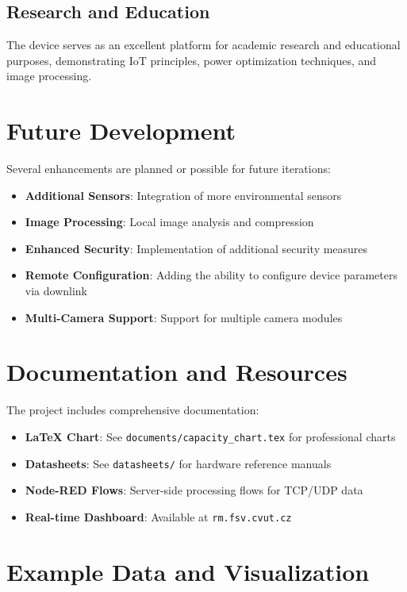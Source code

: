 \documentclass[11pt,a4paper]{article}
\begin{document}
\subsection{Research and Education}

The device serves as an excellent platform for academic research and educational purposes, demonstrating IoT principles, power optimization techniques, and image processing.

\section{Future Development}

Several enhancements are planned or possible for future iterations:

\begin{itemize}
    \item \textbf{Additional Sensors}: Integration of more environmental sensors
    \item \textbf{Image Processing}: Local image analysis and compression
    \item \textbf{Enhanced Security}: Implementation of additional security measures
    \item \textbf{Remote Configuration}: Adding the ability to configure device parameters via downlink
    \item \textbf{Multi-Camera Support}: Support for multiple camera modules
\end{itemize}

\section{Documentation and Resources}

The project includes comprehensive documentation:

\begin{itemize}
    \item \textbf{LaTeX Chart}: See \texttt{documents/capacity\_chart.tex} for professional charts
    \item \textbf{Datasheets}: See \texttt{datasheets/} for hardware reference manuals
    \item \textbf{Node-RED Flows}: Server-side processing flows for TCP/UDP data
    \item \textbf{Real-time Dashboard}: Available at \texttt{rm.fsv.cvut.cz}
\end{itemize}

\section{Example Data and Visualization}
\end{document}
